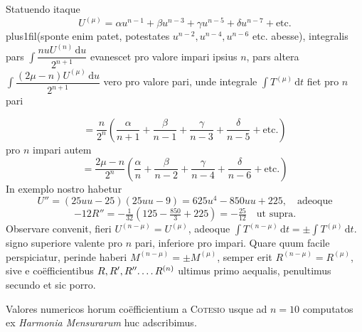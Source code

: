 Statuendo itaque
\[
U^{(\mu)}=\alpha u^{n-1}+\beta u^{n-3}+\gamma u^{n-5}+\delta u^{n-7}+\text{etc.}
\]
\begingroup\rightskip=0pt plus1fil\relax\noindent (sponte enim patet, potestates $u^{n-2},\allowbreak u^{n-4},\allowbreak u^{n-6}$ etc. abesse), integralis pars $\int\dfrac{nuU^{(n)}\,\mathrm{d}u}{2^{n+1}}$ evanescet pro valore impari ipsius $n$, pars altera $\int\dfrac{(2\mu-n)U^{(\mu)}\,\mathrm{d}u}{2^{n+1}}$ vero pro valore pari, unde integrale $\int T^{(\mu)}\,\mathrm{d}t$ fiet pro $n$ pari\par\endgroup
\[
=\frac{n}{2^n}\left(\frac{\alpha}{n+1}+\frac{\beta}{n-1}+\frac{\gamma}{n-3}+\frac{\delta}{n-5}+\text{etc.}\right)
\]
pro $n$ impari autem
\[
=\frac{2\mu-n}{2^n}\left(\frac{\alpha}{n}+\frac{\beta}{n-2}+\frac{\gamma}{n-4}+\frac{\delta}{n-6}+\text{etc.}\right)
\]
In exemplo nostro habetur
\[
U''=(25uu-25)(25uu-9)=625u^4-850uu+225,\quad\text{adeoque}
\]
\[
-12R''=-\tfrac1{32}\left(125-\tfrac{850}{3}+225\right)=-\tfrac{25}{12}\quad\text{ut supra.}
\]
Observare convenit, fieri $U^{(n-\mu)}=U^{(\mu)}$, adeoque $\int T^{(n-\mu)}\,\mathrm{d}t=\pm\int T^{(\mu)}\,\mathrm{d}t$. signo superiore valente pro $n$ pari, inferiore pro impari. Quare quum facile perspiciatur, perinde haberi $M^{(n-\mu)}=\pm M^{(\mu)}$, semper erit $R^{(n-\mu)}=R^{(\mu)}$, sive e co\"efficientibus $R,R',R''\ldotp\ldotp\ldotp\ldotp R^{(n)}$ ultimus primo aequalis, penultimus secundo et sic porro.

Valores numericos horum co\"efficientium a \textsc{Cotesio} usque ad $n=10$ computatos ex \textit{Harmonia Mensurarum} huc adscribimus.

